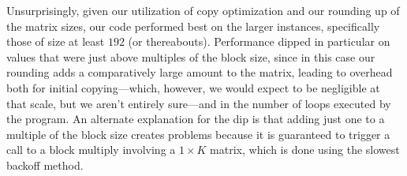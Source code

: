\documentclass[12pt]{article}
\begin{document}
Unsurprisingly, given our utilization of copy optimization and our rounding up of the matrix sizes, our code performed best on the larger instances, specifically those of size at least $192$ (or thereabouts). Performance dipped in particular on values that were just above multiples of the block size, since in this case
our rounding adds a comparatively large amount to the matrix, leading to overhead both for initial copying---which, however, we would expect to be negligible at that scale, but we aren't entirely sure---and in the number of loops executed by the program. An alternate explanation for the dip is that adding just one to
a multiple of the block size creates problems because it is guaranteed to trigger a call to a block multiply involving a $1 \times K$ matrix, which is done using the slowest backoff method.
\end{document}
